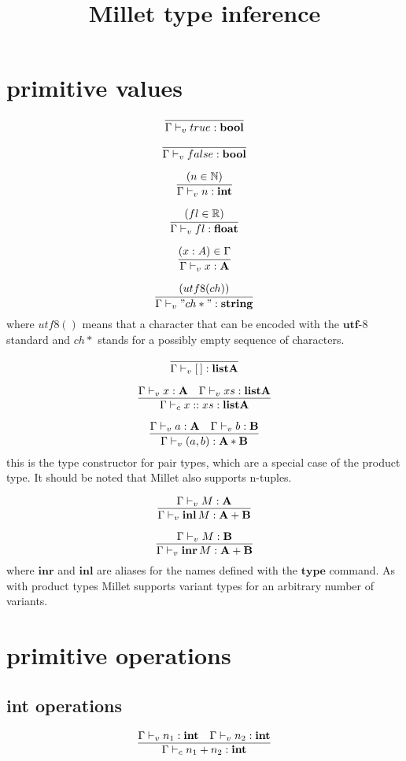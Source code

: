 \documentclass{article}
\title{Millet type inference}
\begin{document}
\maketitle
\section{primitive values}
\[\infer{\Gamma \vdash_v true:\mathbf{bool}}{} \]

\[\infer{\Gamma \vdash_v false:\mathbf{bool}}{} \]

\[\infer{\Gamma \vdash_v n:\mathbf{int}}{(n\in \mathbb{N})}\]

\[\infer{\Gamma \vdash_v fl:\mathbf{float}}{(fl\in \mathbb{R})}\]

\[\infer{\Gamma \vdash_v x:\mathbf{A}}{(x:A)\in \Gamma}\]

\[\infer{\Gamma \vdash_v "ch*":\mathbf{string}}{(utf8(ch))}\]
where $utf8()$ means that a character that can be encoded with the $\mathbf{utf}$-8 standard and $ch*$ stands for a possibly empty sequence of characters.

\[\infer{\Gamma \vdash_v [\,]:\mathbf{list A}}{}\]

\[\infer{\Gamma \vdash_c x::xs:\mathbf{list A}}{\Gamma \vdash_v x: \mathbf{A} \quad \Gamma \vdash_v xs: \mathbf{list A}}\]

\[\infer{\Gamma \vdash_v (a,b):\mathbf{A * B}}{\Gamma \vdash_v a: \mathbf{A} \quad \Gamma \vdash_v b: \mathbf{B}}\]
this is the type constructor for pair types, which are a special case of the product type. It should be noted that Millet also supports n-tuples.

\[\infer{\Gamma \vdash_v \mathbf{inl}\, M:\mathbf{A + B}}{\Gamma \vdash_v M: \mathbf{A}}\]

\[\infer{\Gamma \vdash_v \mathbf{inr}\, M:\mathbf{A + B}}{\Gamma \vdash_v M: \mathbf{B}}\]
where $\mathbf{inr}$ and $\mathbf{inl}$ are aliases for the names defined with the $\mathbf{type}$ command. As with product types Millet supports variant types for an arbitrary number of variants.


\section{primitive operations}

\subsection{int operations}

\[\infer{\Gamma \vdash_c n_1+n_2:\mathbf{int}}{\Gamma \vdash_v n_1: \mathbf{int} \quad \Gamma \vdash_v n_2: \mathbf{int}}\]
\end{document}
